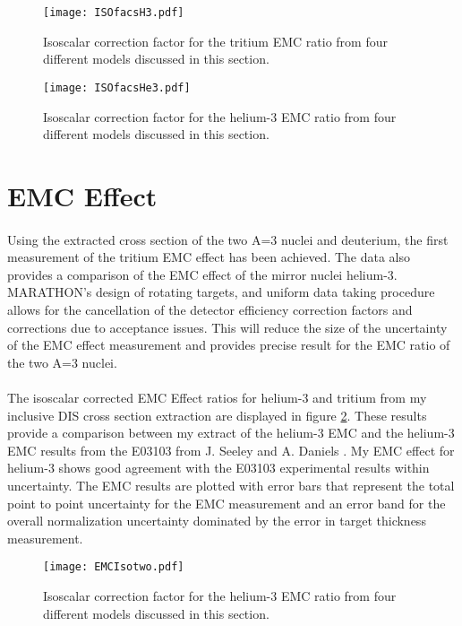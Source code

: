 	\begin{figure}[h]
		\texttt{[image: ISOfacsH3.pdf]}
		\caption{Isoscalar correction factor for the tritium EMC ratio from four different models discussed in this section.}
		\label{isofuncs}
		\vspace{2cm}
		\texttt{[image: ISOfacsHe3.pdf]}
		\caption{Isoscalar correction factor for the helium-3 EMC ratio from four different models discussed in this section.}
		\label{isofuncsHe3}
	\end{figure}

\section{EMC Effect}
\paragraph{} Using the extracted cross section of the two A=3 nuclei and deuterium, the first measurement of the tritium EMC effect has been achieved. The data also provides a comparison of the EMC effect of the mirror nuclei helium-3. MARATHON's design of rotating targets, and uniform data taking procedure allows for the cancellation of the detector efficiency correction factors and corrections due to acceptance issues. This will reduce the size of the uncertainty of the EMC effect measurement and provides precise result for the EMC ratio of the two A=3 nuclei. 
\paragraph{}The isoscalar corrected EMC Effect ratios for helium-3 and tritium from my inclusive DIS cross section extraction are displayed in figure \ref{ISOEMC_B}. These results provide a comparison between my extract of the helium-3 EMC and the helium-3 EMC results from the E03103 from J. Seeley and A. Daniels \cite{seeley}. My EMC effect for helium-3 shows good agreement with the E03103 experimental results within uncertainty. The EMC results are plotted with error bars that represent the total point to point uncertainty for the EMC measurement and an error band for the overall normalization uncertainty dominated by the error in target thickness measurement.  
	\begin{figure}
		\texttt{[image: EMCIsotwo.pdf]}
		\caption{Isoscalar correction factor for the helium-3 EMC ratio from four different models discussed in this section.}
		\label{ISOEMC_B}
	\end{figure}

